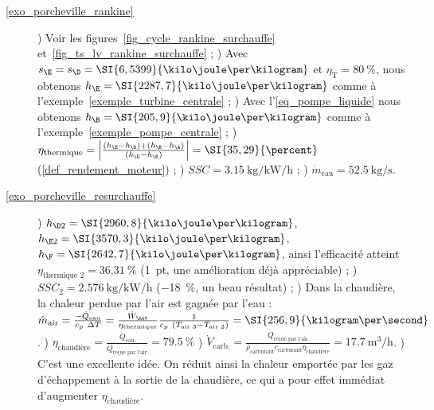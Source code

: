 \exercisesolutionpage
\titreresultats
	
	\begin{description}
		\item [\ref{exo_porcheville_rankine}] 
						) Voir les figures~\ref{fig_cycle_rankine_surchauffe} et~\ref{fig_ts_lv_rankine_surchauffe} ;
						) Avec $s_\E = s_\D = \SI{6,5399}{\kilo\joule\per\kilogram}$ et $\eta_\text{T} = \SI{80}{\percent}$, nous obtenons $h_\E = \SI{2287,7}{\kilo\joule\per\kilogram} $ comme à l’exemple~\ref{exemple_turbine_centrale} ;
						) Avec l’\cref{eq_pompe_liquide} nous obtenons $h_\B = \SI{205,9}{\kilo\joule\per\kilogram}$ comme à l’exemple~\ref{exemple_pompe_centrale} ;
						) $\eta_\text{thermique} = \left|\frac{(h_\E - h_\D) + (h_\B - h_\A)}{(h_\D - h_\B)}\right| = \SI{35,29}{\percent}$ (\ref{def_rendement_moteur}) ;
						) $SSC = \SI[per-mode = symbol]{3,15}{\kilogram\per\kilo\watt\per\hour}$ ;
						) $\dot{m}_\text{eau} = \SI{52,5}{\kilogram\per\second}$.
		\item [\ref{exo_porcheville_resurchauffe}] 
						) $h_{\D2} = \SI{2960,8}{\kilo\joule\per\kilogram}$, $h_{\E2} = \SI{3570,3}{\kilo\joule\per\kilogram}$, $h_\F = \SI{2642,7}{\kilo\joule\per\kilogram}$, ainsi l’efficacité atteint $\eta_\text{thermique 2} = \SI{36,31}{\percent}$ (\SI{+1}{pt}, une amélioration déjà appréciable) ;
						) $SSC_2 = \SI[per-mode = symbol]{2,576}{\kilogram\per\kilo\watt\per\hour}$ (\SI{-18}{\percent}, un beau résultat) ;
						) Dans la chaudière, la chaleur perdue par l’air est gagnée par l’eau : $\dot m_\text{air} = \frac{-\dot Q_\text{eau}}{c_p \ \Delta T} = \frac{\dot W_\net}{\eta_\text{thermique}} \frac{1}{c_p \ (T_\text{air 3} - T_\text{air 2})}	 = \SI{256,9}{\kilogram\per\second}$.
						) $\eta_\text{chaudière} = \frac{\dot Q_\text{eau}}{\dot Q_\text{reçue par l’air}} = \SI{79,5}{\percent}$ 
						) $\dot{V}_\text{carb.} = \frac{\dot Q_\text{reçue par l’air}}{\rho_\text{carburant} c_\text{carburant} \eta_\text{chaudière}} = \SI{17,7}{\metre\cubed\per\hour}$.
						) C’est une excellente idée. On réduit ainsi la chaleur emportée par les gaz d’échappement à la sortie de la chaudière, ce qui a pour effet immédiat d’augmenter $\eta_\text{chaudière}$.
						

\end{description}
